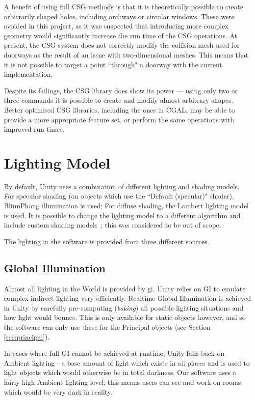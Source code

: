 A benefit of using full CSG methods is that it is theoretically possible to create arbitrarily shaped holes, including archways or circular windows. These were avoided in this project, as it was suspected that introducing more complex geometry would significantly increase the run time of the CSG operations. At present, the CSG system does not correctly modify the collision mesh used for doorways as the result of an issue with two-dimensional meshes. This means that it is not possible to target a point ``through" a doorway with the current implementation.

Despite its failings, the CSG library does show its power --- using only two or three commands it is possible to create and modify almost arbitrary shapes. Better optimised CSG libraries, including the ones in CGAL, may be able to provide a more appropriate feature set, or perform the same operations with improved run times.

\section{Lighting Model}
\label{sec:lighting}

By default, Unity uses a combination of different lighting and shading models. For specular shading (on objects which use the ``Default (specular)" shader), BlinnPhong illumination is used; For diffuse shading, the Lambert lighting model is used. It is possible to change the lighting model to a different algorithm and include custom shading models~\cite{customlighting}; this was considered to be out of scope. 

The lighting in the software is provided from three different sources.

\subsection{Global Illumination}
\label{sec:gi}

Almost all lighting in the World is provided by \acrfull{gi}. Unity relies on GI to emulate complex indirect lighting very efficiently. Realtime Global Illumination is achieved in Unity by carefully pre-computing (\textit{baking}) all possible lighting situations and how light would bounce. This is only available for static objects however, and so the software can only use these for the Principal objects (see Section \ref{sec:principal}). 

In cases where full GI cannot be achieved at runtime, Unity falls back on Ambient lighting - a base amount of light which exists in all places and is used to light objects which would otherwise be in total darkness. Our software uses a fairly high Ambient lighting level; this means users can see and work on rooms which would be very dark in reality. 

